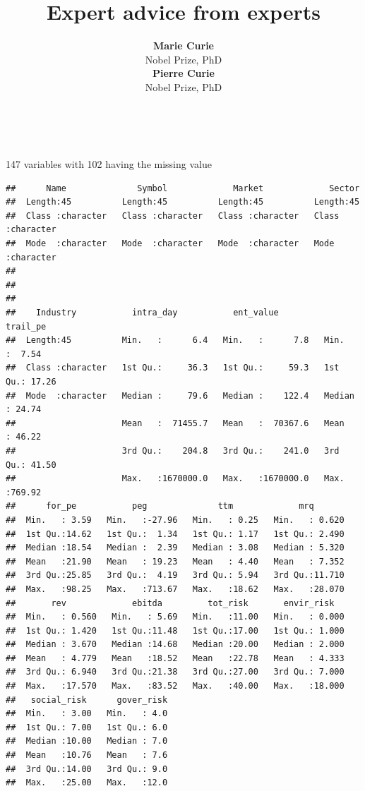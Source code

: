 \documentclass[11pt,a4paper,]{article}
\title{Expert advice from experts}
\author{\sf\Large\textbf{ Marie Curie}\\ {\sf\large Nobel Prize, PhD\\[0.5cm]} \sf\Large\textbf{ Pierre Curie}\\ {\sf\large Nobel Prize, PhD\\[0.5cm]}}
\date{\sf\Date~\Month~\Year}
\makeatletter
\def\titlepage{\front{\expandafter{\@title}}{\@author}{\@organization}}
\makeatother
\begin{document}
\titlepage

147 variables with 102 having the missing value

\begin{verbatim}
##      Name              Symbol             Market             Sector         
##  Length:45          Length:45          Length:45          Length:45         
##  Class :character   Class :character   Class :character   Class :character  
##  Mode  :character   Mode  :character   Mode  :character   Mode  :character  
##                                                                             
##                                                                             
##                                                                             
##    Industry           intra_day           ent_value            trail_pe     
##  Length:45          Min.   :      6.4   Min.   :      7.8   Min.   :  7.54  
##  Class :character   1st Qu.:     36.3   1st Qu.:     59.3   1st Qu.: 17.26  
##  Mode  :character   Median :     79.6   Median :    122.4   Median : 24.74  
##                     Mean   :  71455.7   Mean   :  70367.6   Mean   : 46.22  
##                     3rd Qu.:    204.8   3rd Qu.:    241.0   3rd Qu.: 41.50  
##                     Max.   :1670000.0   Max.   :1670000.0   Max.   :769.92  
##      for_pe           peg              ttm             mrq        
##  Min.   : 3.59   Min.   :-27.96   Min.   : 0.25   Min.   : 0.620  
##  1st Qu.:14.62   1st Qu.:  1.34   1st Qu.: 1.17   1st Qu.: 2.490  
##  Median :18.54   Median :  2.39   Median : 3.08   Median : 5.320  
##  Mean   :21.90   Mean   : 19.23   Mean   : 4.40   Mean   : 7.352  
##  3rd Qu.:25.85   3rd Qu.:  4.19   3rd Qu.: 5.94   3rd Qu.:11.710  
##  Max.   :98.25   Max.   :713.67   Max.   :18.62   Max.   :28.070  
##       rev             ebitda         tot_risk       envir_risk    
##  Min.   : 0.560   Min.   : 5.69   Min.   :11.00   Min.   : 0.000  
##  1st Qu.: 1.420   1st Qu.:11.48   1st Qu.:17.00   1st Qu.: 1.000  
##  Median : 3.670   Median :14.68   Median :20.00   Median : 2.000  
##  Mean   : 4.779   Mean   :18.52   Mean   :22.78   Mean   : 4.333  
##  3rd Qu.: 6.940   3rd Qu.:21.38   3rd Qu.:27.00   3rd Qu.: 7.000  
##  Max.   :17.570   Max.   :83.52   Max.   :40.00   Max.   :18.000  
##   social_risk      gover_risk  
##  Min.   : 3.00   Min.   : 4.0  
##  1st Qu.: 7.00   1st Qu.: 6.0  
##  Median :10.00   Median : 7.0  
##  Mean   :10.76   Mean   : 7.6  
##  3rd Qu.:14.00   3rd Qu.: 9.0  
##  Max.   :25.00   Max.   :12.0
\end{verbatim}
\end{document}
